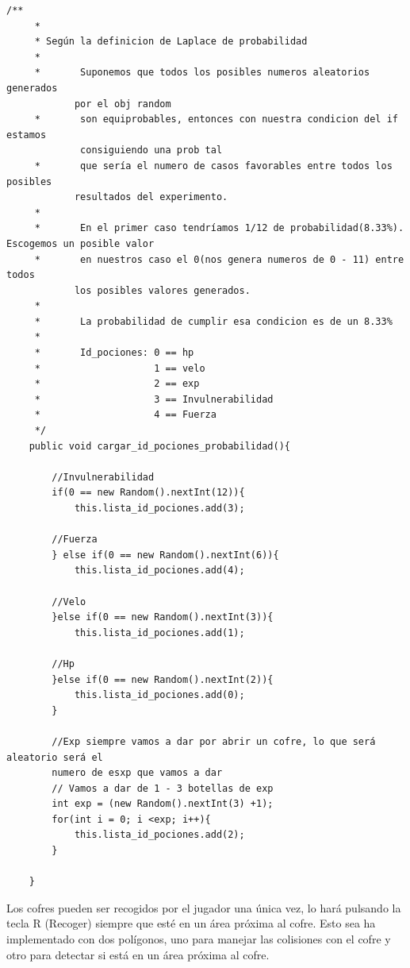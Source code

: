 \begin{verbatim}
/**
     * 
     * Según la definicion de Laplace de probabilidad 
     *   
     *       Suponemos que todos los posibles numeros aleatorios generados 
            por el obj random 
     *       son equiprobables, entonces con nuestra condicion del if estamos
             consiguiendo una prob tal 
     *       que sería el numero de casos favorables entre todos los posibles 
            resultados del experimento.
     *   
     *       En el primer caso tendríamos 1/12 de probabilidad(8.33%). Escogemos un posible valor
     *       en nuestros caso el 0(nos genera numeros de 0 - 11) entre todos
            los posibles valores generados.
     *   
     *       La probabilidad de cumplir esa condicion es de un 8.33%
     *   
     *       Id_pociones: 0 == hp
     *                    1 == velo
     *                    2 == exp
     *                    3 == Invulnerabilidad
     *                    4 == Fuerza
     */
    public void cargar_id_pociones_probabilidad(){
        
        //Invulnerabilidad
        if(0 == new Random().nextInt(12)){
            this.lista_id_pociones.add(3);
        
        //Fuerza
        } else if(0 == new Random().nextInt(6)){
            this.lista_id_pociones.add(4);
        
        //Velo
        }else if(0 == new Random().nextInt(3)){
            this.lista_id_pociones.add(1);
        
        //Hp
        }else if(0 == new Random().nextInt(2)){
            this.lista_id_pociones.add(0);
        }
        
        //Exp siempre vamos a dar por abrir un cofre, lo que será aleatorio será el
        numero de esxp que vamos a dar
        // Vamos a dar de 1 - 3 botellas de exp
        int exp = (new Random().nextInt(3) +1);
        for(int i = 0; i <exp; i++){
            this.lista_id_pociones.add(2);
        }
        
    }
\end{verbatim}
Los cofres pueden ser recogidos por el jugador una única vez, lo hará pulsando la tecla R (Recoger) siempre que esté en un área próxima al cofre. Esto sea ha implementado con dos polígonos, uno para manejar las colisiones con el cofre y otro para detectar si está en un área próxima al cofre.
\newpage
